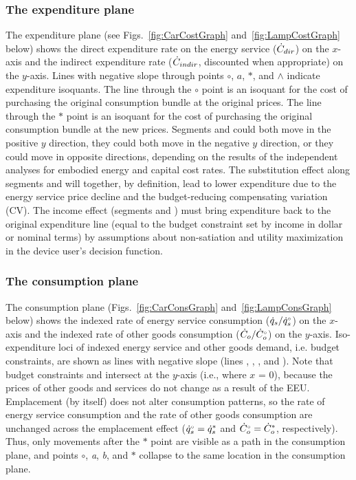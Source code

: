 \documentclass[12pt]{article}\usepackage[]{graphicx}\usepackage[]{xcolor}
\begin{document}
\subsubsection{The expenditure plane}
\label{sec:expenditure_path_graphs}

The expenditure plane (see Figs.~\ref{fig:CarCostGraph} and~\ref{fig:LampCostGraph} below) shows
the direct expenditure rate on the energy service ($\dot{C}_{dir}$) on the $x$-axis and
the indirect expenditure rate
($\dot{C}_{indir}$, discounted when appropriate)
on the $y$-axis.
Lines with negative slope through points $\circ$, $a$, $*$, and $\wedge$
indicate expenditure isoquants.
The line through the $\circ$ point is an isoquant for the
cost of purchasing the original consumption bundle
at the original prices.
The line through the $*$ point is an isoquant for the
cost of purchasing the original consumption bundle
at the new prices.
Segments \ab{} and \bstar{}
could both move in the positive $y$ direction,
they could both move in the negative $y$ direction, or
they could move in opposite directions,
depending on the results of the independent analyses for
embodied energy and capital cost rates.
The substitution effect along segments \starc{} and \chat{}
will together, by definition, lead to lower expenditure
due to the energy service price decline and
the budget-reducing compensating variation (CV).
The income effect (segments \hatd{} and \dbar{}) must bring expenditure
back to the original expenditure line
(equal to the budget constraint set by income in dollar or nominal terms)
by assumptions about non-satiation and utility maximization
in the device user's decision function.


\subsubsection{The consumption plane}
\label{sec:consumption_path_graphs}

The consumption plane
(Figs.~\ref{fig:CarConsGraph} and~\ref{fig:LampConsGraph} below) shows
the indexed rate of energy service consumption ($\dot{q}_s/{}{\dot{q}}^{\scriptscriptstyle \circ}_s$) on the $x$-axis and
the indexed rate of other goods consumption ($\dot{C}_o/{}{\dot{C}}^{\scriptscriptstyle \circ}_o$) on the $y$-axis.
Iso-expenditure loci of indexed energy service and other goods demand,
i.e. budget constraints,
are shown as lines with negative slope
(lines \circcirc{}, \starstar{}, \hathat{}, and \barbar{}).
Note that budget constraints \circcirc{} and \barbar{}
intersect at the $y$-axis (i.e., where $x$ = 0),
because the prices of other goods and services do not change
as a result of the EEU.
Emplacement (by itself) does not alter consumption patterns, so
the rate of energy service consumption and
the rate of other goods consumption are
unchanged across the emplacement effect
(${}{\dot{q}}^{\scriptscriptstyle \circ}_s = {\dot{q}}^*_s$ and ${}{\dot{C}}^{\scriptscriptstyle \circ}_o = {\dot{C}}^*_o$, respectively).
Thus,
only movements after the $*$ point are visible as a path in the consumption plane, and
points $\circ$, \emph{a}, \emph{b}, and $*$
collapse to the same location in the consumption plane.
\end{document}
